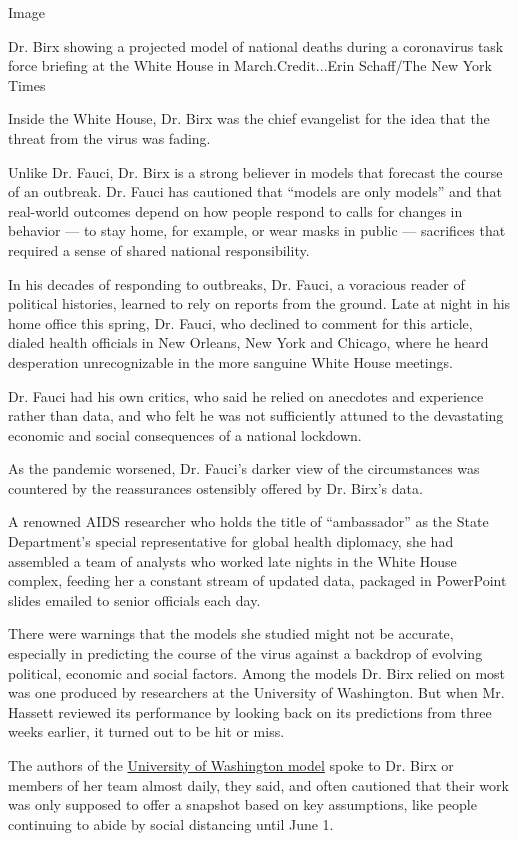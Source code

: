 Image

Dr. Birx showing a projected model of national deaths during a
coronavirus task force briefing at the White House in
March.Credit...Erin Schaff/The New York Times

Inside the White House, Dr. Birx was the chief evangelist for the idea
that the threat from the virus was fading.

Unlike Dr. Fauci, Dr. Birx is a strong believer in models that forecast
the course of an outbreak. Dr. Fauci has cautioned that ``models are
only models'' and that real-world outcomes depend on how people respond
to calls for changes in behavior --- to stay home, for example, or wear
masks in public --- sacrifices that required a sense of shared national
responsibility.

In his decades of responding to outbreaks, Dr. Fauci, a voracious reader
of political histories, learned to rely on reports from the ground. Late
at night in his home office this spring, Dr. Fauci, who declined to
comment for this article, dialed health officials in New Orleans, New
York and Chicago, where he heard desperation unrecognizable in the more
sanguine White House meetings.

Dr. Fauci had his own critics, who said he relied on anecdotes and
experience rather than data, and who felt he was not sufficiently
attuned to the devastating economic and social consequences of a
national lockdown.

As the pandemic worsened, Dr. Fauci's darker view of the circumstances
was countered by the reassurances ostensibly offered by Dr. Birx's data.

A renowned AIDS researcher who holds the title of ``ambassador'' as the
State Department's special representative for global health diplomacy,
she had assembled a team of analysts who worked late nights in the White
House complex, feeding her a constant stream of updated data, packaged
in PowerPoint slides emailed to senior officials each day.

There were warnings that the models she studied might not be accurate,
especially in predicting the course of the virus against a backdrop of
evolving political, economic and social factors. Among the models Dr.
Birx relied on most was one produced by researchers at the University of
Washington. But when Mr. Hassett reviewed its performance by looking
back on its predictions from three weeks earlier, it turned out to be
hit or miss.

The authors of the
\href{http://www.healthdata.org/covid/faqs}{University of Washington
model} spoke to Dr. Birx or members of her team almost daily, they said,
and often cautioned that their work was only supposed to offer a
snapshot based on key assumptions, like people continuing to abide by
social distancing until June 1.

